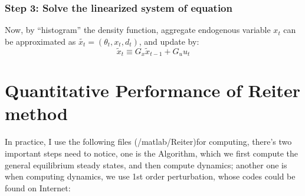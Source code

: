 \subsubsection*{Step 3: Solve the linearized system of equation }
Now, by ``histogram'' the density function, aggregate endogenous variable $x_t$ can be approximated  as $\tilde{x_t} = (\theta_t, x_t, d_t)$, and update by:
\[ \tilde{x}_t \equiv G_x \tilde{x}_{t-1} + G_u u_t\]

\newpage


\section{Quantitative Performance of Reiter method}

In practice, I use the following files (/matlab/Reiter)for computing, there's two important steps need to notice, one is the Algorithm, which we first compute the general equilibrium steady states, and then compute dynamics; another one is when computing dynamics, we use 1st order perturbation, whose codes could be found on Internet: 

